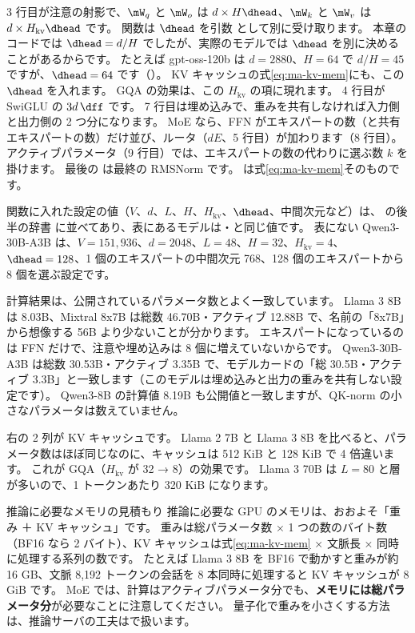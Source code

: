 
3 行目が注意の射影で、$\mW_q$ と $\mW_o$ は $d\times H\dhead$、$\mW_k$ と $\mW_v$ は $d\times H_{\mathrm{kv}}\dhead$ です。
関数は $\dhead$ を引数  として別に受け取ります。
本章のコードでは $\dhead=d/H$ でしたが、実際のモデルでは $\dhead$ を別に決めることがあるからです。
たとえば gpt-oss-120b は $d=2880$、$H=64$ で $d/H=45$ ですが、$\dhead=64$ です（）。
KV キャッシュの式\eqref{eq:ma-kv-mem}にも、この $\dhead$ を入れます。
GQA の効果は、この $H_{\mathrm{kv}}$ の項に現れます。
4 行目が SwiGLU の $3d\,\dff$ です。
7 行目は埋め込みで、重みを共有しなければ入力側と出力側の 2 つ分になります。
MoE なら、FFN がエキスパートの数（と共有エキスパートの数）だけ並び、ルータ（$dE$、5 行目）が加わります（8 行目）。
アクティブパラメータ（9 行目）では、エキスパートの数の代わりに選ぶ数 $k$ を掛けます。
最後の  は最終の RMSNorm です。
 は式\eqref{eq:ma-kv-mem}そのものです。


関数に入れた設定の値（$V$、$d$、$L$、$H$、$H_{\mathrm{kv}}$、$\dhead$、中間次元など）は、 の後半の辞書  に並べてあり、表にあるモデルは・と同じ値です。
表にない Qwen3-30B-A3B は、$V=151{,}936$、$d=2048$、$L=48$、$H=32$、$H_{\mathrm{kv}}=4$、$\dhead=128$、1 個のエキスパートの中間次元 768、128 個のエキスパートから 8 個を選ぶ設定です。

計算結果は、公開されているパラメータ数とよく一致しています。
Llama 3 8B は 8.03B、Mixtral 8x7B は総数 46.70B・アクティブ 12.88B で、名前の「8x7B」から想像する 56B より少ないことが分かります。
エキスパートになっているのは FFN だけで、注意や埋め込みは 8 個に増えていないからです。
Qwen3-30B-A3B は総数 30.53B・アクティブ 3.35B で、モデルカードの「総 30.5B・アクティブ 3.3B」と一致します（このモデルは埋め込みと出力の重みを共有しない設定です）\cite{yang2025qwen3}。
Qwen3-8B の計算値 8.19B も公開値と一致しますが、QK-norm の小さなパラメータは数えていません。

右の 2 列が KV キャッシュです。
Llama 2 7B と Llama 3 8B を比べると、パラメータ数はほぼ同じなのに、キャッシュは 512 KiB と 128 KiB で 4 倍違います。
これが GQA（$H_{\mathrm{kv}}$ が 32 → 8）の効果です。
Llama 3 70B は $L=80$ と層が多いので、1 トークンあたり 320 KiB になります。

\begin{practice}{推論に必要なメモリの見積もり}
推論に必要な GPU のメモリは、おおよそ「重み ＋ KV キャッシュ」です。
重みは総パラメータ数 × 1 つの数のバイト数（BF16 なら 2 バイト）、KV キャッシュは式\eqref{eq:ma-kv-mem} × 文脈長 × 同時に処理する系列の数です。
たとえば Llama 3 8B を BF16 で動かすと重みが約 16 GB、文脈 8,192 トークンの会話を 8 本同時に処理すると KV キャッシュが 8 GiB です。
MoE では、計算はアクティブパラメータ分でも、\textbf{メモリには総パラメータ分}が必要なことに注意してください。
量子化で重みを小さくする方法は、推論サーバの工夫はで扱います。
\end{practice}

